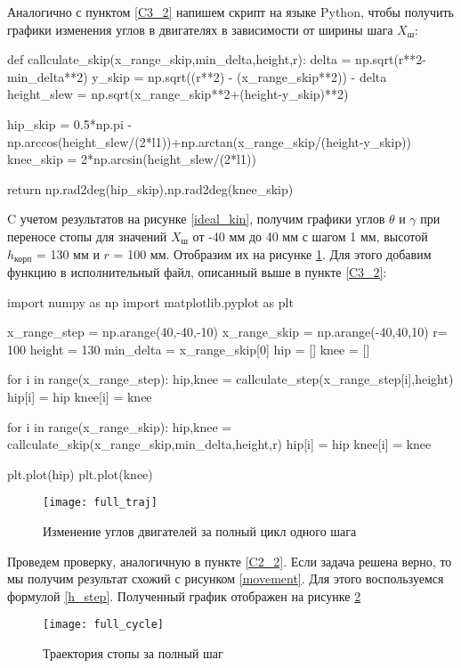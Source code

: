 Аналогично с пунктом \ref{C3_2} напишем скрипт на языке Python, чтобы получить графики изменения углов в двигателях в зависимости от ширины шага $X_{\text{ш}}$:

 \begin{python}
	def callculate_skip(x_range_skip,min_delta,height,r):
		delta = np.sqrt(r**2-min_delta**2)
		y_skip = np.sqrt((r**2) - (x_range_skip**2)) - delta
		height_slew = np.sqrt(x_range_skip**2+(height-y_skip)**2)
		
		hip_skip = 0.5*np.pi - np.arccos(height_slew/(2*l1))+np.arctan(x_range_skip/(height-y_skip))
		knee_skip = 2*np.arcsin(height_slew/(2*l1))
		
		return np.rad2deg(hip_skip),np.rad2deg(knee_skip)
\end{python}

C учетом результатов на рисунке \ref{ideal_kin}, получим графики углов $\theta$ и $\gamma$ при переносе стопы для значений $X_{\text{ш}}$ от -40 мм до 40 мм с шагом 1 мм, высотой $h_\text{корп}$ = 130 мм и $r$ = 100 мм. Отобразим их на рисунке \ref{full_traj}. Для этого добавим функцию в исполнительный файл, описанный выше в пункте \ref{C3_2}:
\newpage
\begin{python}
	import numpy as np
	import matplotlib.pyplot as plt
	
	x_range_step = np.arange(40,-40,-10)
	x_range_skip = np.arange(-40,40,10)
	r= 100
	height = 130
	min_delta = x_range_skip[0]
	hip = []
	knee = []
	
	for i in range(x_range_step):
		hip,knee = callculate_step(x_range_step[i],height)
		hip[i] = hip
		knee[i] = knee
	
	for i in range(x_range_skip):
		hip,knee = callculate_skip(x_range_skip,min_delta,height,r)
		hip[i] = hip
		knee[i] = knee
	
	plt.plot(hip)
	plt.plot(knee)
\end{python}

\begin{figure}[h!]
	\begin{center}
		\texttt{[image: full\_traj]}
		\caption{Изменение углов двигателей за полный цикл одного шага}
		\label{full_traj}
	\end{center}
\end{figure}
\newpage
Проведем проверку, аналогичную в пункте \ref{C2_2}. Если задача решена верно, то мы получим результат схожий с рисунком \ref{movement}. Для этого воспользуемся формулой \ref{h_step}. Полученный график отображен на рисунке \ref{full_cycle}

\begin{figure}[h!]
	\begin{center}
		\texttt{[image: full\_cycle]}
		\caption{Траектория стопы за полный шаг}
		\label{full_cycle}
	\end{center}
\end{figure}

\newpage